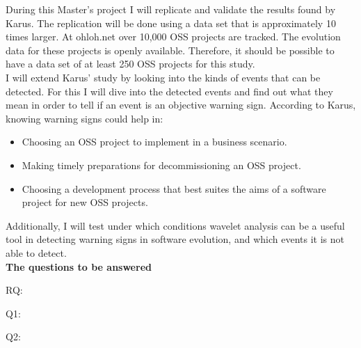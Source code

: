 During this Master's project I will replicate and validate the results found by
Karus. The replication will be done using a data set that is approximately 10 times
larger. At ohloh.net over 10,000 OSS projects are tracked. The evolution data
for these projects is openly available. Therefore, it should be possible to
have a data set of at least 250 OSS projects for this study.
\\

I will extend Karus' study by looking into the kinds of events that can be
detected. For this I will dive into the detected events and find out what they
mean in order to tell if an event is an objective warning sign. According to
Karus, knowing warning signs could help in:
\begin{itemize}
	\item Choosing an OSS project to implement in a business scenario.
	\item Making timely preparations for decommissioning an OSS project.
	\item Choosing a development process that best suites the aims of a software
	project for new OSS projects.
\end{itemize}

Additionally, I will test under which conditions wavelet analysis can be a
useful tool in detecting warning signs in software evolution, and which events
it is not able to detect.
\\

\noindent
\bfseries{The questions to be answered}\rm
\begin{description}
	\item[RQ:] \emph{\researchQuestion} \cite{karus2013}
	\item[Q1:] \emph{\subQuestionOne}
	\item[Q2:] \emph{\subQuestionTwo}
\end{description}
